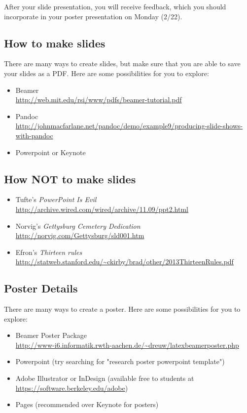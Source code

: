 \documentclass[11pt, oneside]{article}   	%
\begin{document}
After your slide presentation, you will receive feedback, which you should
incorporate in your poster presentation on Monday (2/22).

\subsection*{How to make slides}

There are many ways to create slides, but make sure that you are able to
save your slides as a PDF.  Here are some possibilities for you to explore:
\begin{itemize}
\item Beamer\\
 \url{http://web.mit.edu/rsi/www/pdfs/beamer-tutorial.pdf}
\item Pandoc\\
 \url{http://johnmacfarlane.net/pandoc/demo/example9/producing-slide-shows-with-pandoc}
\item Powerpoint or Keynote
\end{itemize}

\subsection*{How \textbf{NOT} to make slides}

\begin{itemize}
\item Tufte's \emph{PowerPoint Is Evil}\\
 \url{http://archive.wired.com/wired/archive/11.09/ppt2.html}
\item Norvig's \emph{Gettysburg Cemetery Dedication}\\
 \url{http://norvig.com/Gettysburg/sld001.htm}
\item Efron's \emph{Thirteen rules}\\
 \url{http://statweb.stanford.edu/~ckirby/brad/other/2013ThirteenRules.pdf}
\end{itemize}

\subsection{Poster Details}

There are many ways to create a poster. Here are some possibilities for you to explore:
\begin{itemize}
\item Beamer Poster Package\\
 \url{http://www-i6.informatik.rwth-aachen.de/~dreuw/latexbeamerposter.php}
\item Powerpoint (try searching for "research poster powerpoint template")
\item Adobe Illustrator or InDesign (available free to students at \url{https://software.berkeley.edu/adobe})
\item Pages (recommended over Keynote for posters)
\end{itemize}
\end{document}
